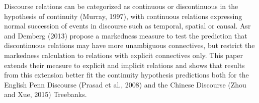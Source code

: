 Discourse relations can be categorized as continuous or discontinuous in the hypothesis of continuity (Murray, 1997), with continuous relations expressing normal succession of events in discourse such as temporal, spatial or causal. Asr and Demberg (2013) propose a markedness measure to test the prediction that discontinuous relations may have more unambiguous connectives, but restrict the markedness calculation to relations with explicit connectives only. This paper extends their measure to explicit and implicit relations and shows that results from this extension better fit the continuity hypothesis predictions both for the English Penn Discourse (Prasad et al., 2008) and the Chinese Discourse (Zhou and Xue, 2015) Treebanks.
